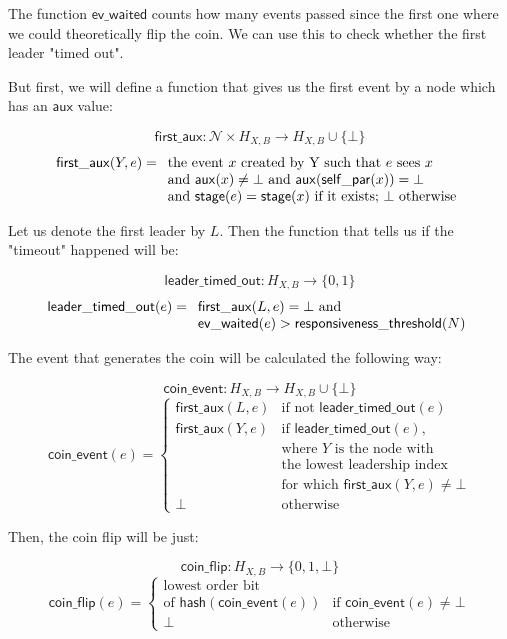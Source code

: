 \documentclass[a4paper,fleqn]{article}
\begin{document}
The function $\mathsf{ev\_waited}$ counts how many events passed since the first one where we could
theoretically flip the coin. We can use this to check whether the first leader "timed out".

But first, we will define a function that gives us the first event by a node which has an
$\mathsf{aux}$ value:

\[ \mathsf{first\_aux}: \mathcal{N} \times H_{X,B} \to H_{X,B} \cup \{ \bot \} \]
\[ \mathsf{first\_aux}(Y, e) = \begin{array}[t]{l}
	\textrm{the event $x$ created by Y such that $e$ sees $x$} \\
	\textrm{and $\mathsf{aux}(x) \neq \bot$ and $\mathsf{aux}(\mathsf{self\_par}(x)) = \bot$} \\
	\textrm{and $\mathsf{stage}(e) = \mathsf{stage}(x)$ if it exists; $\bot$ otherwise}
\end{array} \]

Let us denote the first leader by $L$. Then the function that tells us if the "timeout" happened
will be:

\[ \mathsf{leader\_timed\_out}: H_{X,B} \to \{0,1\} \]
\[ \mathsf{leader\_timed\_out}(e) = \begin{array}[t]{l}
	\textrm{$\mathsf{first\_aux}(L, e) = \bot$ and} \\
	\mathsf{ev\_waited}(e) > \mathsf{responsiveness\_threshold}(N)
\end{array} \]

The event that generates the coin will be calculated the following way:

\[ \mathsf{coin\_event}: H_{X,B} \to H_{X,B} \cup \{ \bot \} \]
\[ \mathsf{coin\_event}(e) = \left\{ \begin{array}{ll}
	\mathsf{first\_aux}(L, e) & \textrm{if not $\mathsf{leader\_timed\_out}(e)$} \\
	\mathsf{first\_aux}(Y, e) & \textrm{if $\mathsf{leader\_timed\_out}(e)$,}\\
	& \textrm{where $Y$ is the node with} \\
	& \textrm{the lowest leadership index} \\
	& \textrm{for which $\mathsf{first\_aux}(Y, e) \neq \bot$} \\
	\bot & \textrm{otherwise}
\end{array}\right. \]

Then, the coin flip will be just:

\[ \mathsf{coin\_flip}: H_{X,B} \to \{0,1,\bot\} \]
\[ \mathsf{coin\_flip}(e) = \left\{ \begin{array}{ll}
	\textrm{lowest order bit} & \\
	\textrm{of $\mathsf{hash}(\mathsf{coin\_event}(e))$} & \textrm{if $\mathsf{coin\_event}(e)
		\neq \bot$} \\
	\bot & \textrm{otherwise}
\end{array}\right. \]
\end{document}
